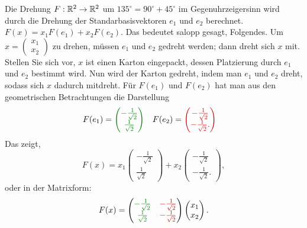 \begin{bsp} 
 Die Drehung $F : \mathbb R^2 \to \mathbb R^2$ um $135^\circ = 90^\circ + 45^\circ$ im Gegenuhrzeigersinn wird durch die Drehung der Standarbasisvektoren $e_1$ und $e_2$ berechnet. $F(x) = x_1 F(e_1) + x_2 F(e_2)$. Das bedeutet salopp gesagt, Folgendes. Um $x = \begin{pmatrix} x_1 \\ x_2 \end{pmatrix}$ zu drehen, müssen $e_1$ und $e_2$ gedreht werden; dann dreht sich $x$ mit. Stellen Sie sich vor, $x$ ist einen Karton eingepackt, dessen Platzierung durch $e_1$ und $e_2$ bestimmt wird. Nun wird der Karton gedreht, indem man $e_1$ und $e_2$ dreht, sodass sich $x$ dadurch mitdreht. Für $F(e_1)$ und $F(e_2)$ hat man aus den geometrischen Betrachtungen die Darstellung 
 \begin{align*} 
 		F(e_1)  & = {\color{green!50!black} \begin{pmatrix}  -\frac{1}{\sqrt{2}} \\ \frac{1}{\sqrt{2}} 
 		\end{pmatrix} }
 	& 
 		F(e_2)  & = {\color{red!80!black} \begin{pmatrix}  -\frac{1}{\sqrt{2}} \\ -\frac{1}{\sqrt{2}}. 
\end{pmatrix} } 
 \end{align*} 
Das zeigt, 
\[
	F(x)  = x_1 \begin{pmatrix}  -\frac{1}{\sqrt{2}} \\ \frac{1}{\sqrt{2}} 
	\end{pmatrix}  + x_2 \begin{pmatrix}  -\frac{1}{\sqrt{2}} \\ - \frac{1}{\sqrt{2}}. 
\end{pmatrix},
\]
oder in der Matrixform: 
\[
	F (x) = \begin{pmatrix} {\color{green!50!black} -\frac{1}{\sqrt{2}}} & { \color{red!80!black} -\frac{1}{\sqrt{2}}} \\
		{\color{green!50!black} \frac{1}{\sqrt{2}} } & { \color{red!80!black} - \frac{1}{\sqrt{2}}} \end{pmatrix} \begin{pmatrix} x_1 \\ x_2 \end{pmatrix}. 
\]
\begin{center} 
\end{center}
\end{bsp}
